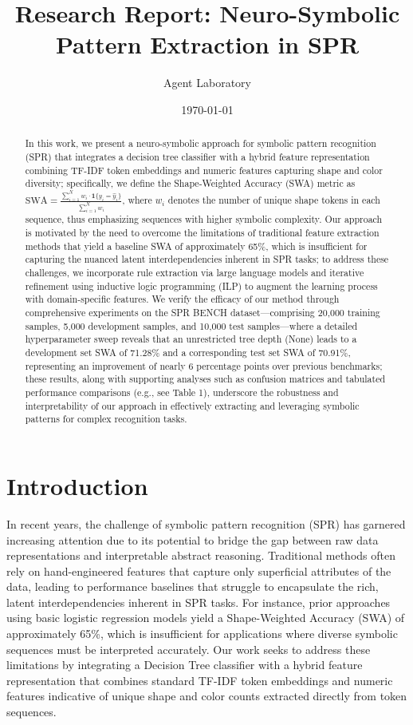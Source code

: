 \documentclass{article}
\title{Research Report: Neuro-Symbolic Pattern Extraction in SPR}
\author{Agent Laboratory}
\date{\today}
\begin{document}
\maketitle

\begin{abstract}
In this work, we present a neuro-symbolic approach for symbolic pattern recognition (SPR) that integrates a decision tree classifier with a hybrid feature representation combining TF-IDF token embeddings and numeric features capturing shape and color diversity; specifically, we define the Shape-Weighted Accuracy (SWA) metric as \( \text{SWA} = \frac{\sum_{i=1}^{N} w_i \cdot \mathbf{1}\{y_i = \hat{y}_i\}}{\sum_{i=1}^{N} w_i} \), where \(w_i\) denotes the number of unique shape tokens in each sequence, thus emphasizing sequences with higher symbolic complexity. Our approach is motivated by the need to overcome the limitations of traditional feature extraction methods that yield a baseline SWA of approximately 65\%, which is insufficient for capturing the nuanced latent interdependencies inherent in SPR tasks; to address these challenges, we incorporate rule extraction via large language models and iterative refinement using inductive logic programming (ILP) to augment the learning process with domain-specific features. We verify the efficacy of our method through comprehensive experiments on the SPR BENCH dataset—comprising 20,000 training samples, 5,000 development samples, and 10,000 test samples—where a detailed hyperparameter sweep reveals that an unrestricted tree depth (None) leads to a development set SWA of 71.28\% and a corresponding test set SWA of 70.91\%, representing an improvement of nearly 6 percentage points over previous benchmarks; these results, along with supporting analyses such as confusion matrices and tabulated performance comparisons (e.g., see Table 1), underscore the robustness and interpretability of our approach in effectively extracting and leveraging symbolic patterns for complex recognition tasks.
\end{abstract}

\section{Introduction}
In recent years, the challenge of symbolic pattern recognition (SPR) has garnered increasing attention due to its potential to bridge the gap between raw data representations and interpretable abstract reasoning. Traditional methods often rely on hand-engineered features that capture only superficial attributes of the data, leading to performance baselines that struggle to encapsulate the rich, latent interdependencies inherent in SPR tasks. For instance, prior approaches using basic logistic regression models yield a Shape-Weighted Accuracy (SWA) of approximately 65\%, which is insufficient for applications where diverse symbolic sequences must be interpreted accurately. Our work seeks to address these limitations by integrating a Decision Tree classifier with a hybrid feature representation that combines standard TF-IDF token embeddings and numeric features indicative of unique shape and color counts extracted directly from token sequences.
\end{document}
